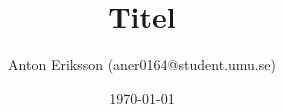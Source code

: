 \title{Titel}
\author{Anton Eriksson (aner0164@student.umu.se)}
\date{\today}

\begin{titlepage}
	\maketitle
	\thispagestyle{fancy}
	\headheight 30pt
	\rhead{\today}
\end{titlepage}
